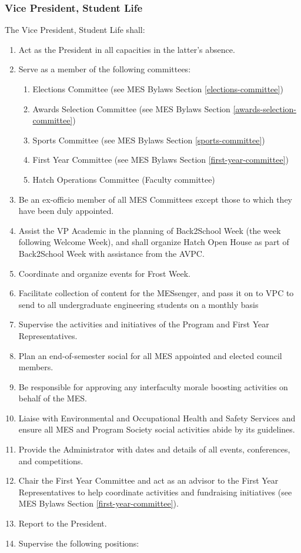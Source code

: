 \subsubsection{Vice President, Student
 Life}
\label{vice-president-student-life}
The Vice President, Student Life shall:

\begin{enumerate}
 \item
  Act as the President in all capacities in the latter's absence.
 \item
  Serve as a member of the following committees:

  \begin{enumerate}
   \item
    Elections Committee (see MES Bylaws Section
    \ref{elections-committee})
   \item
    Awards Selection Committee (see MES Bylaws Section
    \ref{awards-selection-committee})
   \item
    Sports Committee (see MES Bylaws Section \ref{sports-committee})
   \item
    First Year Committee (see MES Bylaws Section
    \ref{first-year-committee})
   \item
    Hatch Operations Committee (Faculty committee)
  \end{enumerate}
 \item
  Be an ex-officio member of all MES Committees except those to which
  they have been duly appointed.
 \item
  Assist the VP Academic in the planning of Back2School Week (the week
  following Welcome Week), and shall organize Hatch Open House as part
  of Back2School Week with assistance from the AVPC.
 \item
  Coordinate and organize events for Frost Week.
 \item
  Facilitate collection of content for the MESsenger, and pass it on to
  VPC to send to all undergraduate engineering students on a monthly
  basis
 \item
  Supervise the activities and initiatives of the Program and First Year
  Representatives.
 \item
  Plan an end-of-semester social for all MES appointed and elected
  council members.
 \item
  Be responsible for approving any interfaculty morale boosting
  activities on behalf of the MES.
 \item
  Liaise with Environmental and Occupational Health and Safety Services
  and ensure all MES and Program Society social activities abide by its guidelines.
 \item
  Provide the Administrator with dates and details of all events,
  conferences, and competitions.
 \item
  Chair the First Year Committee and act as an advisor to the First Year
  Representatives to help coordinate activities and fundraising
  initiatives (see MES Bylaws Section \ref{first-year-committee}).
 \item
  Report to the President.
 \item
  Supervise the following positions:


\end{enumerate}

